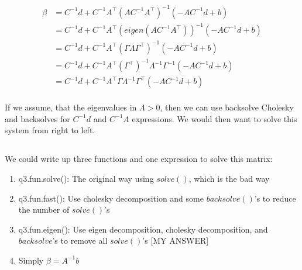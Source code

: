 \documentclass{article}\usepackage[]{graphicx}\usepackage[]{color}
\begin{document}
$$\begin{aligned}
\beta &= C^{-1} d +C^{-1}A^\top (AC^{-1}A^\top)^{-1} (-AC^{-1}d + b) \\
&= C^{-1} d +C^{-1}A^\top (eigen(AC^{-1}A^\top))^{-1} (-AC^{-1}d + b) \\
&= C^{-1} d +C^{-1}A^\top (\Gamma \Lambda \Gamma^\top)^{-1} (-AC^{-1}d + b) \\
&= C^{-1} d +C^{-1}A^\top (\Gamma^\top)^{-1} \Lambda^{-1} \Gamma^{-1} (-AC^{-1}d + b) \\
&= C^{-1} d +C^{-1}A^\top \Gamma \Lambda^{-1} \Gamma^\top (-AC^{-1}d + b) \\
\end{aligned}$$

If we assume, that the eigenvalues in $\Lambda > 0$, then we can use backsolve Cholesky and backsolves for $C^{-1} d$ and $C^{-1}A$ expressions. We would then want to solve this system from right to left.


\subsection{}

We could write up three functions and one expression to solve this matrix: 

\begin{enumerate}
    \item q3.fun.solve(): The original way using $solve()$, which is the bad way
    \item q3.fun.fast(): Use cholesky decomposition and some $backsolve()$'s to reduce the number of $solve()$'s
    \item q3.fun.eigen(): Use eigen decomposition, cholesky decomposition, and $backsolve$'s to remove all $solve()$'s [MY ANSWER]
    \item Simply $\beta = A^{-1}b$
\end{enumerate}
\end{document}
